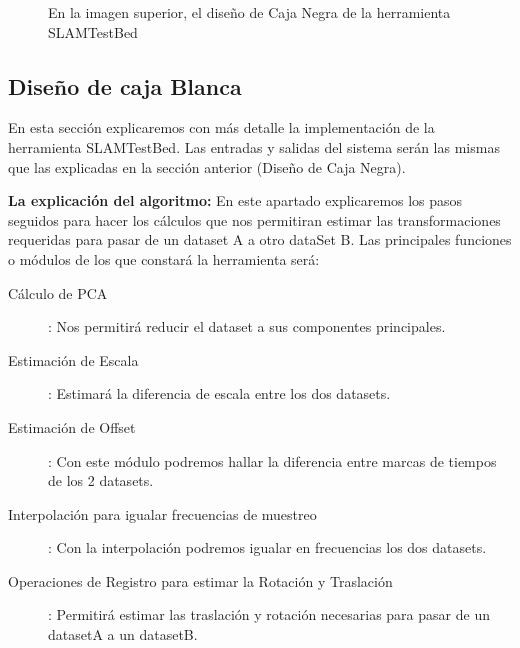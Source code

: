 \begin{figure}[H]
\begin{center}
\hspace{0.5cm}
\end{center}
\caption{ En la imagen superior, el diseño de Caja Negra de la herramienta SLAMTestBed }
\end{figure}

\subsection{Diseño de caja Blanca}
En esta sección explicaremos con más detalle la implementación de la herramienta SLAMTestBed.
Las entradas y salidas del sistema serán las mismas que las explicadas en la sección anterior (Diseño de Caja Negra).

\textbf{La explicación del algoritmo:}
En este apartado explicaremos los pasos seguidos para hacer los cálculos que nos permitiran estimar las transformaciones requeridas para pasar de un dataset A a otro dataSet B. 
Las principales funciones o módulos de los que constará la herramienta será:
\begin{description}
\item [Cálculo de PCA]: Nos permitirá reducir el dataset a  sus componentes principales.
\item [Estimación de Escala]: Estimará la diferencia de escala entre los dos datasets.
\item [Estimación de Offset]: Con este módulo podremos hallar la diferencia entre marcas de tiempos de los 2 datasets.
\item [Interpolación para igualar frecuencias de muestreo]: Con la interpolación podremos igualar en frecuencias los dos datasets.
\item [Operaciones de Registro para estimar la Rotación y Traslación]: Permitirá estimar las traslación y rotación necesarias para pasar de un datasetA a un datasetB.
\end{description}


